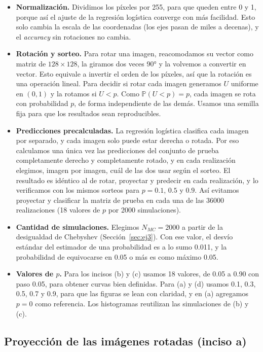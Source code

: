 \documentclass[11pt,a4paper]{article}
\newcommand{\Prob}{\mathbb{P}}
\newcommand{\acc}{\emph{accuracy}}
\begin{document}
\begin{itemize}
  \item \textbf{Normalización.} Dividimos los píxeles por 255, para que queden entre 0 y 1, porque así el
        ajuste de la regresión logística converge con más facilidad. Esto solo cambia la escala de las
        coordenadas (los ejes pasan de miles a decenas), y el \acc{} sin rotaciones no cambia.
  \item \textbf{Rotación y sorteo.} Para rotar una imagen, reacomodamos su vector como matriz de
        $128\times128$, la giramos dos veces 90° y la volvemos a convertir en vector. Esto equivale a
        invertir el orden de los píxeles, así que la rotación es una operación lineal. Para decidir si rotar
        cada imagen generamos $U$ uniforme en $(0,1)$ y la rotamos si $U<p$. Como $\Prob(U<p)=p$, cada
        imagen se rota con probabilidad $p$, de forma independiente de las demás. Usamos una semilla fija
        para que los resultados sean reproducibles.
  \item \textbf{Predicciones precalculadas.} La regresión logística clasifica cada imagen por separado, y
        cada imagen solo puede estar derecha o rotada. Por eso calculamos una única vez las predicciones del
        conjunto de prueba completamente derecho y completamente rotado, y en cada realización elegimos,
        imagen por imagen, cuál de las dos usar según el sorteo. El resultado es idéntico al de rotar,
        proyectar y predecir en cada realización, y lo verificamos con los mismos sorteos para $p = 0.1$,
        $0.5$ y $0.9$. Así evitamos proyectar y clasificar la matriz de prueba en cada una de las 36000
        realizaciones (18 valores de $p$ por 2000 simulaciones).
  \item \textbf{Cantidad de simulaciones.} Elegimos $N_{MC}=2000$ a partir de la desigualdad de Chebyshev
        (Sección~\ref{sec:ej3}). Con ese valor, el desvío estándar del estimador de una probabilidad es a lo
        sumo 0.011, y la probabilidad de equivocarse en 0.05 o más es como máximo 0.05.
  \item \textbf{Valores de $p$.} Para los incisos (b) y (c) usamos 18 valores, de 0.05 a 0.90 con paso
        0.05, para obtener curvas bien definidas. Para (a) y (d) usamos 0.1, 0.3, 0.5, 0.7 y 0.9, para que
        las figuras se lean con claridad, y en (a) agregamos $p=0$ como referencia. Los histogramas
        reutilizan las simulaciones de (b) y (c).
\end{itemize}

\subsection{Proyección de las imágenes rotadas (inciso a)}
\end{document}
